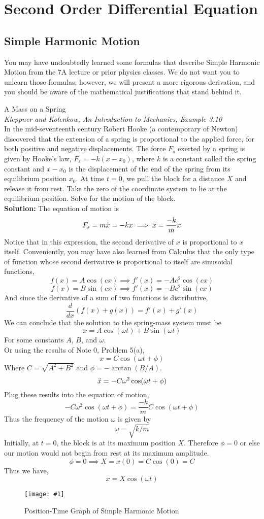 \documentclass[11pt]{article}
\newcommand{\fig}[4]{
    \begin{figure}[H]
        \centering
        \texttt{[image: \#1]}
        \caption{#2}
        \label{exp4fit}
    \end{figure}
}
\theoremstyle{gangnamstyle}{\newtheorem{definition}{Definition}[]}
\theoremstyle{gangnamstyle}{\newtheorem{example}{Example}[]}
\theoremstyle{gangnamstyle}{\newtheorem{problem}{Problem}[]}
\theoremstyle{gangnamstyle}{\newtheorem{warning}{Warning}[]}
\begin{document}
\section{Second Order Differential Equation}
\subsection{Simple Harmonic Motion}

You may have undoubtedly learned some formulas that describe Simple Harmonic Motion from the 7A lecture or prior physics classes. We do not want you to unlearn those formulas; however, we will present a more rigorous derivation, and you should be aware of the mathematical justifications that stand behind it. 

\begin{example}
A Mass on a Spring \\
\textit{Kleppner and Kolenkow, An Introduction to Mechanics, Example 3.10} \\
In the mid-seventeenth century Robert Hooke (a contemporary of Newton) discovered that the extension of a spring is proportional to the applied force, for both positive and negative displacements. The force $F_s$ exerted by a spring is given by Hooke’s law, $F_s = -k(x - x_0)$, where $k$ is a constant called the spring constant and $x - x_0$ is the displacement of the end of the spring from its equilibrium position $x_0$. At time $t = 0$, we pull the block for a distance $X$ and release it from rest. Take the zero of the coordinate system to lie at the equilibrium position. Solve for the motion of the block. \\

\textbf{Solution:} The equation of motion is
\[ F_s = m\Ddot{x} = -kx \implies \Ddot{x} = \frac{-k}{m}x \]
Notice that in this expression, the second derivative of $x$ is proportional to $x$ itself. Conveniently, you may have also learned from Calculus that the only type of function whose second derivative is proportional to itself are sinusoidal functions, 
\[ f(x) = A\cos(cx) \implies f'(x) = -Ac^2\cos(cx) \]
\[ f(x) = B\sin(cx) \implies f'(x) = -Bc^2\sin(cx) \]
And since the derivative of a sum of two functions is distributive, 
\[ \frac{d}{dx}(f(x) + g(x)) = f'(x) + g'(x) \]
We can conclude that the solution to the spring-mass system must be
\[ x = A\cos(\omega t) + B\sin(\omega t) \]
For some constants $A$, $B$, and $\omega$. \\
Or using the results of Note 0, Problem 5(a), 
\[ x = C\cos(\omega t + \phi) \]
Where $C = \sqrt{A^2 + B^2}$ and $\phi = -\arctan(B/A)$.
\[ \Ddot{x} = -C\omega^2\cos(\omega t + \phi) \]
Plug these results into the equation of motion, 
\[ -C\omega^2\cos(\omega t + \phi) = \frac{-k}{m} C\cos(\omega t + \phi) \]
Thus the frequency of the motion $\omega$ is given by
\[ \omega = \sqrt{k/m} \]
Initially, at $t = 0$, the block is at its maximum position $X$. Therefore $\phi = 0$ or else our motion would not begin from rest at its maximum amplitude. 
\[ \phi = 0 \implies X = x(0) = C\cos(0) = C \]
Thus we have, 
\[ x = X\cos(\omega t) \]
\fig{figs/n1/cos.jpg}{Position-Time Graph of Simple Harmonic Motion}{0.5}{0}
\end{example}
\end{document}
